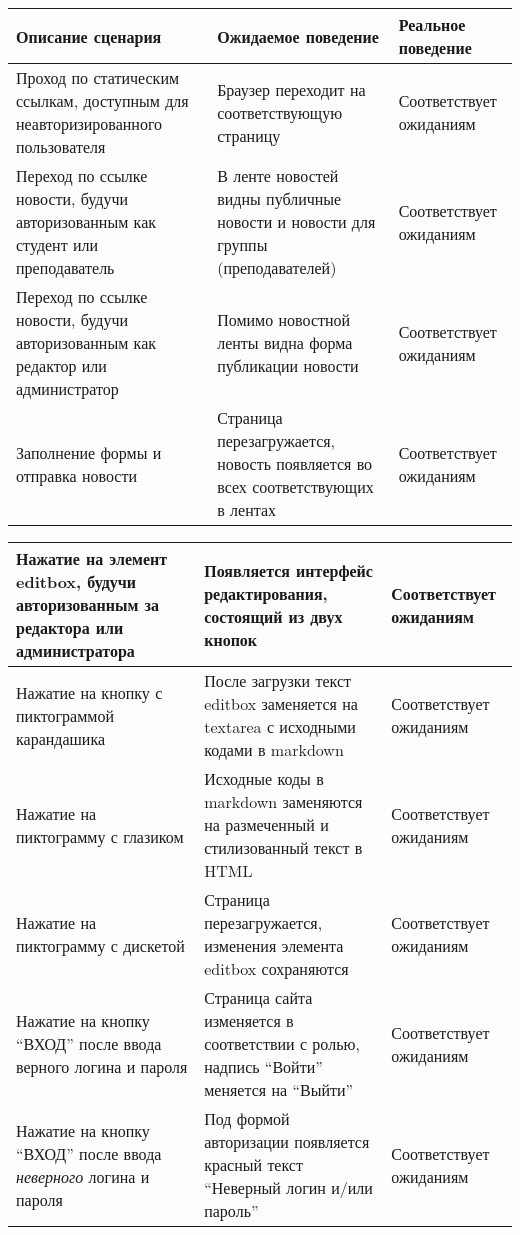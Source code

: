 \documentclass[14pt]{extarticle}
\begin{document}
\begin{center}
\begin{tabular}{| p{5cm} | p{5cm} | p{5cm} |}
\hline
Описание сценария & Ожидаемое поведение & Реальное поведение\\
\hline
Проход по статическим ссылкам, доступным для неавторизированного пользователя &
Браузер переходит на соответствующую страницу &
Соответствует ожиданиям\\
\hline
Переход по ссылке новости, будучи авторизованным как студент или преподаватель &
В ленте новостей видны публичные новости и новости для группы (преподавателей) &
Соответствует ожиданиям\\
\hline
Переход по ссылке новости, будучи авторизованным как редактор или администратор &
Помимо новостной ленты видна форма публикации новости &
Соответствует ожиданиям\\
\hline
Заполнение формы и отправка новости &
Страница перезагружается, новость появляется во всех соответствующих в лентах &
Соответствует ожиданиям\\
\end{tabular}

\begin{tabular}{| p{5cm} | p{5cm} | p{5cm} |}
Нажатие на элемент editbox, будучи авторизованным за редактора или администратора &
Появляется интерфейс редактирования, состоящий из двух кнопок &
Соответствует ожиданиям\\
\hline
Нажатие на кнопку с пиктограммой карандашика &
После загрузки текст editbox заменяется на textarea с исходными кодами в markdown &
Соответствует ожиданиям\\
\hline
Нажатие на пиктограмму с глазиком &
Исходные коды в markdown заменяются на размеченный и стилизованный текст в HTML &
Соответствует ожиданиям\\
\hline
Нажатие на пиктограмму с дискетой &
Страница перезагружается, изменения элемента editbox сохраняются &
Соответствует ожиданиям\\
\hline
Нажатие на кнопку \enquote{ВХОД} после ввода верного логина и пароля &
Страница сайта изменяется в соответствии с ролью, надпись \enquote{Войти} меняется на \enquote{Выйти} &
Соответствует ожиданиям\\
\hline
Нажатие на кнопку \enquote{ВХОД} после ввода \emph{неверного} логина и пароля &
Под формой авторизации появляется красный текст \enquote{Неверный логин и/или пароль} &
Соответствует ожиданиям\\
\end{tabular}


\end{center}
\end{document}
